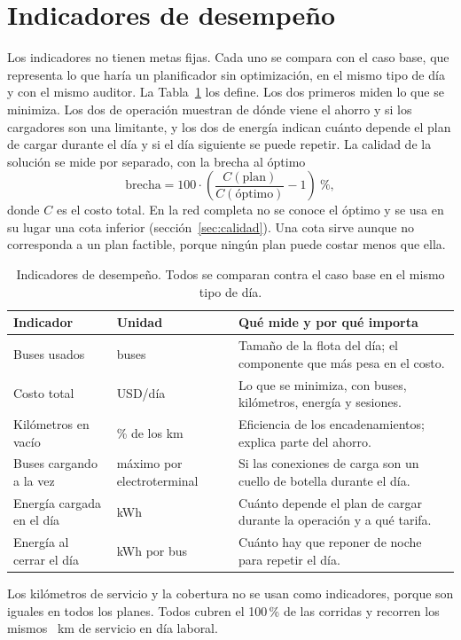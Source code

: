 \section{Indicadores de desempeño}
\label{sec:kpis}

Los indicadores no tienen metas fijas. Cada uno se compara con el caso base, que representa lo que haría un planificador sin optimización, en el mismo tipo de día y con el mismo auditor. La Tabla~\ref{tab:kpis} los define. Los dos primeros miden lo que se minimiza. Los dos de operación muestran de dónde viene el ahorro y si los cargadores son una limitante, y los dos de energía indican cuánto depende el plan de cargar durante el día y si el día siguiente se puede repetir. La calidad de la solución se mide por separado, con la brecha al óptimo
\[
\text{brecha} = 100\cdot\left(\frac{C(\text{plan})}{C(\text{óptimo})}-1\right)\ \%,
\]
donde \(C\) es el costo total. En la red completa no se conoce el óptimo y se usa en su lugar una cota inferior (sección~\ref{sec:calidad}). Una cota sirve aunque no corresponda a un plan factible, porque ningún plan puede costar menos que ella.

\begin{table}[htbp]
\centering
\caption{Indicadores de desempeño. Todos se comparan contra el caso base en el mismo tipo de día.}
\label{tab:kpis}
\small
\begin{tabularx}{\textwidth}{@{}l l X@{}}
\toprule
Indicador & Unidad & Qué mide y por qué importa \\
\midrule
Buses usados & buses & Tamaño de la flota del día; el componente que más pesa en el costo. \\
Costo total & USD/día & Lo que se minimiza, con buses, kilómetros, energía y sesiones. \\
Kilómetros en vacío & \% de los km & Eficiencia de los encadenamientos; explica parte del ahorro. \\
Buses cargando a la vez & máximo por electroterminal & Si las conexiones de carga son un cuello de botella durante el día. \\
Energía cargada en el día & kWh & Cuánto depende el plan de cargar durante la operación y a qué tarifa. \\
Energía al cerrar el día & kWh por bus & Cuánto hay que reponer de noche para repetir el día. \\
\bottomrule
\end{tabularx}
\end{table}

Los kilómetros de servicio y la cobertura no se usan como indicadores, porque son iguales en todos los planes. Todos cubren el 100\,\% de las corridas y recorren los mismos \KmServicioLaboral~km de servicio en día laboral.
